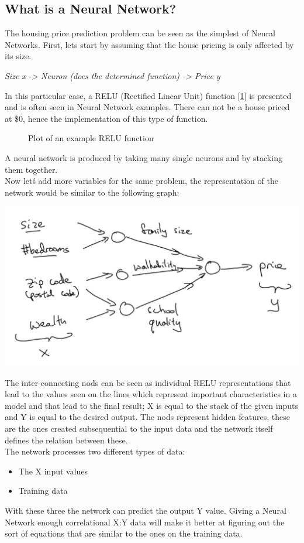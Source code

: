 \documentclass[11pt]{report}
\begin{document}
\subsection{What is a Neural Network?}
The housing price prediction problem can be seen as the simplest of Neural Networks. First, lets start by assuming that the house pricing is only affected by its size.
\begin{center}
	\textit{Size x -> Neuron (does the determined function) -> Price y}
\end{center}
In this particular case, a RELU (Rectified Linear Unit) function [\ref{fig:F1}] is presented and is often seen in Neural Network examples. There can not be a house priced at \$0, hence the implementation of this type of function.
\begin{figure}
	\centering
	\caption{Plot of an example RELU function} \label{fig:F1}
\end{figure}
A neural network is produced by taking many single neurons and by stacking them together. \\
Now let\'s add more variables for the same problem, the representation of the network would be similar to the following graph:
\begin{center}
	\includegraphics[width = .50\textwidth]{HPP.png}
\end{center}
The inter-connecting nods can be seen as individual RELU representations that lead to the values seen on the lines which represent important characteristics in a model and that lead to the final result; X is equal to the stack of the given inputs and Y is equal to the desired output. The  nods represent hidden features, these are the ones created subsequential to the input data and the network itself defines the relation between these.\\
The network processes two different types of data:
\begin{itemize}
	\item The X input values
	\item Training data
\end{itemize}
With these three the network can predict the output Y value. Giving a Neural Network enough correlational X:Y data will make it better at figuring out the sort of equations that are similar to the ones on the training data.
\end{document}
